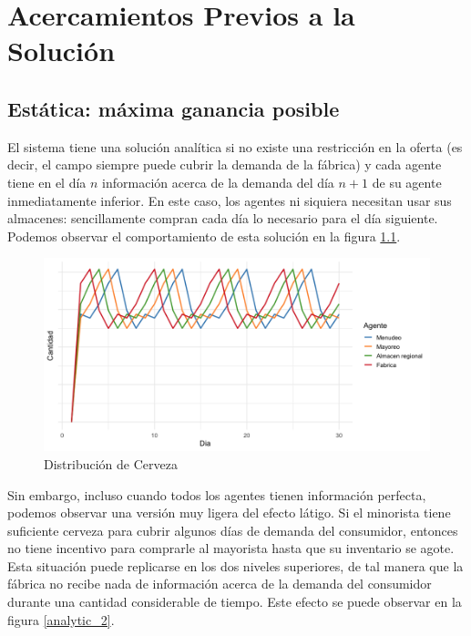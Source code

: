 \chapter{Acercamientos Previos a la Soluci\'on}

\section{Est\'atica: m\'axima ganancia posible}

El sistema tiene una soluci\'on anal\'itica si no existe una restricci\'on en la oferta (es decir, el campo siempre puede cubrir la demanda de la f\'abrica) y cada agente tiene en el d\'ia $n$ informaci\'on acerca de la demanda del d\'ia $n+1$ de su agente inmediatamente inferior. En este caso, los agentes ni siquiera necesitan usar sus almacenes: sencillamente compran cada d\'ia lo necesario para el d\'ia siguiente. Podemos observar el comportamiento de esta soluci\'on en la figura \ref{analytic_1}.

\begin{figure}[h!]
\caption{Distribuci\'on de Cerveza}
\label{analytic_1}
\includegraphics[width=12cm]{tesis_tex/figs/analytic_solution_0_all_0_inv.png}
\centering
\end{figure}

Sin embargo, incluso cuando todos los agentes tienen informaci\'on perfecta, podemos observar una versi\'on muy ligera del efecto l\'atigo. Si el minorista tiene suficiente cerveza para cubrir algunos d\'ias de demanda del consumidor, entonces no tiene incentivo para comprarle al mayorista hasta que su inventario se agote. Esta situaci\'on puede replicarse en los dos niveles superiores, de tal manera que la f\'abrica no recibe nada de informaci\'on acerca de la demanda del consumidor durante una cantidad considerable de tiempo. Este efecto se puede observar en la figura \ref{analytic_2}.

